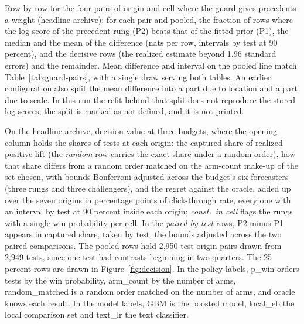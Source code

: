 \begin{table}[t]\centering\scriptsize
\caption{Row by row for the four pairs of origin and cell where the guard gives precedents a weight (headline archive): for each pair and pooled, the fraction of rows where the log score of the precedent rung (P2) beats that of the fitted prior (P1), the median and the mean of the difference (nats per row, intervals by test at 90 percent), and the decisive rows (the realized estimate beyond 1.96 standard errors) and the remainder. Mean difference and interval on the pooled line match Table~\ref{tab:guard-pairs}, with a single draw serving both tables. An earlier configuration also split the mean difference into a part due to location and a part due to scale. In this run the refit behind that split does not reproduce the stored log scores, the split is marked as not defined, and it is not printed.}
\label{tab:guard-pairs-rows}
\resizebox{\textwidth}{!}{}
\end{table}

\begin{table}[t]\centering\scriptsize
\caption{On the headline archive, decision value at three budgets, where the opening column holds the shares of tests at each origin: the captured share of realized positive lift (the \emph{random} row carries the exact share under a random order), how that share differs from a random order matched on the arm-count make-up of the set chosen, with bounds Bonferroni-adjusted across the budget's six forecasters (three rungs and three challengers), and the regret against the oracle, added up over the seven origins in percentage points of click-through rate, every one with an interval by test at 90 percent inside each origin; \emph{const.\ in cell} flags the rungs with a single win probability per cell. In the \emph{paired by test} rows, P2 minus P1 appears in captured share, taken by test, the bounds adjusted across the two paired comparisons. The pooled rows hold 2,950 test-origin pairs drawn from 2,949 tests, since one test had contrasts beginning in two quarters. The 25 percent rows are drawn in Figure~\ref{fig:decision}. In the policy labels, p\_win orders tests by the win probability, arm\_count by the number of arms, random\_matched is a random order matched on the number of arms, and oracle knows each result. In the model labels, GBM is the boosted model, local\_eb the local comparison set and text\_lr the text classifier.}
\label{tab:decision-intervals-upworthy}

\end{table}

